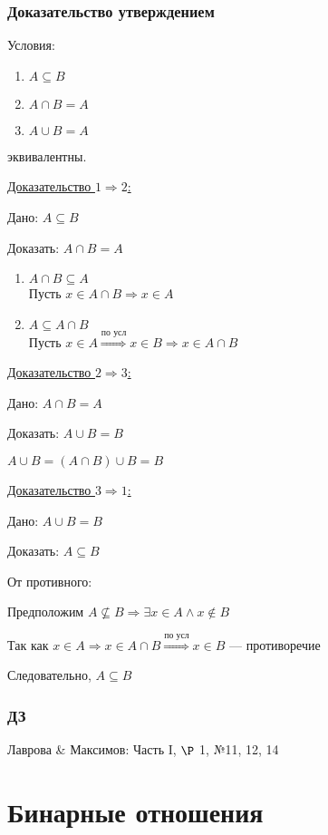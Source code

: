 \documentclass{article}
\begin{document}
\subsubsection{Доказательство утверждением}

Условия:
\begin{enumerate}
	\item $A \subseteq B$
	\item $A \cap B = A$
	\item $A \cup B = A$
\end{enumerate}
эквивалентны.

{\Large \underline{Доказательство $1 \Rightarrow 2$:}}

Дано: $A \subseteq B$

Доказать: $A \cap B = A$

\begin{enumerate}
	\item $A \cap B \subseteq A$\\
	Пусть $x \in A \cap B \Rightarrow x \in A$
	\item $A \subseteq A \cap B$\\
	Пусть $x \in A \stackrel{\text{по усл}}{\Rightarrow} x \in B
	\Rightarrow x \in A \cap B$
\end{enumerate}

{\Large \underline{Доказательство $2 \Rightarrow 3$:}}

Дано: $A \cap B = A$

Доказать: $A \cup B = B$

$A \cup B = (A \cap B) \cup B = B$

{\Large \underline{Доказательство $3 \Rightarrow 1$:}}

Дано: $A \cup B = B$

Доказать: $A \subseteq B$

От противного:

Предположим $A \not \subseteq B \Rightarrow \exists x \in A \land x \not \in B$

Так как $x \in A \Rightarrow x \in A \cap B
\stackrel{\text{по усл}}{\Rightarrow} x \in B$ --- противоречие

Следовательно, $A \subseteq B$

\subsubsection{ДЗ}

Лаврова \& Максимов: Часть I, $\P$ 1, №11, 12, 14

\section{Бинарные отношения}
\end{document}
